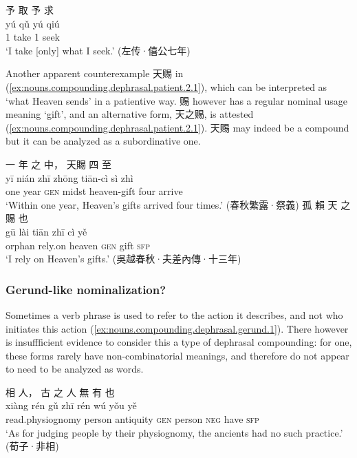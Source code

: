 \documentclass[UTF8, a4paper, oneside, scheme=plain, 12pt]{ctexrep}
\newcommand{\translate}[1]{`#1'}
\newcommand*{\category}[1]{\textsc{#1}}
\begin{document}
\begin{exe}
    \ex\label{ex:nouns.compounding.dephrasal.patient.1}
    \glll 予 取 予 求 \\
    yú qǔ yú qiú \\
    1 take 1 seek \\
    \glt\translate{I take [only] what I seek.} \hfill (左传·僖公七年)
\end{exe}

Another apparent counterexample 天赐 in (\ref{ex:nouns.compounding.dephrasal.patient.2.1}),
which can be interpreted as \translate{what Heaven sends} in a patientive way.
赐 however has a regular nominal usage meaning \translate{gift},
and an alternative form, 天之赐, is attested (\ref{ex:nouns.compounding.dephrasal.patient.2.1}).
天赐 may indeed be a compound but it can be analyzed as a subordinative one.

\begin{exe} 
    \ex\label{ex:nouns.compounding.dephrasal.patient.2}
    \glll 一 年 之 中， 天賜 四 至 \\
    yī nián zhī zhōng tiān-cì sì zhì \\
    one year \category{gen} midst heaven-gift four arrive \\
    \glt\translate{Within one year, Heaven's gifts arrived four times.} \hfill (春秋繁露·祭義)
    \ex\label{ex:nouns.compounding.dephrasal.patient.2.1}
    \glll 孤 賴 天 之 賜 也 \\
    gū lài tiān zhī cì yě \\
    orphan rely.on heaven \category{gen} gift \category{sfp} \\
    \glt\translate{I rely on Heaven's gifts.} \hfill (吳越春秋·夫差內傳·十三年)
\end{exe}

\subsubsection{Gerund-like nominalization?}\label{sec:nouns.compounding.dephrasal.gerund}

Sometimes a verb phrase is used to refer to the action it describes,
and not who initiates this action (\ref{ex:nouns.compounding.dephrasal.gerund.1}).
There however is insuffficient evidence to consider this a type of dephrasal compounding:
for one, these forms rarely have non-combinatorial meanings,
and therefore do not appear to need to be analyzed as words.

\begin{exe}
    \ex\label{ex:nouns.compounding.dephrasal.gerund.1}
    \glll 相 人， 古 之 人 無 有 也 \\
    xiàng rén gǔ zhī rén wú yǒu yě \\
    read.physiognomy person antiquity \category{gen} person \category{neg} have \category{sfp} \\
    \glt\translate{As for judging people by their physiognomy, the ancients had no such practice.} \hfill (荀子·非相)
\end{exe}
\end{document}
